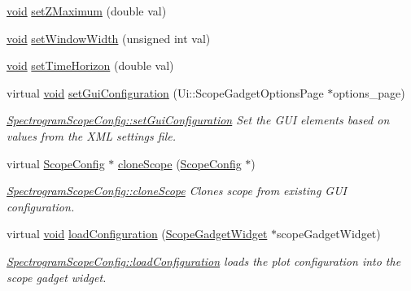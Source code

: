 \begin{DoxyCompactItemize}
\item 
\hyperlink{group___u_a_v_objects_plugin_ga444cf2ff3f0ecbe028adce838d373f5c}{void} \hyperlink{group___scope_plugin_ga4f71e9c45cd8cbebb11505f9f6d18a42}{set\-Z\-Maximum} (double val)
\item 
\hyperlink{group___u_a_v_objects_plugin_ga444cf2ff3f0ecbe028adce838d373f5c}{void} \hyperlink{group___scope_plugin_gaf3bc69a747cec5908674e2df1118cd82}{set\-Window\-Width} (unsigned int val)
\item 
\hyperlink{group___u_a_v_objects_plugin_ga444cf2ff3f0ecbe028adce838d373f5c}{void} \hyperlink{group___scope_plugin_ga511f9914f1f524bd49a6edfa18760501}{set\-Time\-Horizon} (double val)
\item 
virtual \hyperlink{group___u_a_v_objects_plugin_ga444cf2ff3f0ecbe028adce838d373f5c}{void} \hyperlink{group___scope_plugin_gaf4d1958704699a8b7bb596fef64c6bd5}{set\-Gui\-Configuration} (\-Ui\-::\-Scope\-Gadget\-Options\-Page $\ast$options\-\_\-page)
\begin{DoxyCompactList}\small\item\em \hyperlink{group___scope_plugin_gaf4d1958704699a8b7bb596fef64c6bd5}{\-Spectrogram\-Scope\-Config\-::set\-Gui\-Configuration} \-Set the \-G\-U\-I elements based on values from the \-X\-M\-L settings file. \end{DoxyCompactList}\item 
virtual \hyperlink{class_scope_config}{\-Scope\-Config} $\ast$ \hyperlink{group___scope_plugin_ga7d2fafe0c5f703d03825ad42689a9d73}{clone\-Scope} (\hyperlink{class_scope_config}{\-Scope\-Config} $\ast$)
\begin{DoxyCompactList}\small\item\em \hyperlink{group___scope_plugin_ga7d2fafe0c5f703d03825ad42689a9d73}{\-Spectrogram\-Scope\-Config\-::clone\-Scope} \-Clones scope from existing \-G\-U\-I configuration. \end{DoxyCompactList}\item 
virtual \hyperlink{group___u_a_v_objects_plugin_ga444cf2ff3f0ecbe028adce838d373f5c}{void} \hyperlink{group___scope_plugin_gaa4de5cf86195631ccdce65d67b22f31a}{load\-Configuration} (\hyperlink{class_scope_gadget_widget}{\-Scope\-Gadget\-Widget} $\ast$scope\-Gadget\-Widget)
\begin{DoxyCompactList}\small\item\em \hyperlink{group___scope_plugin_gaa4de5cf86195631ccdce65d67b22f31a}{\-Spectrogram\-Scope\-Config\-::load\-Configuration} loads the plot configuration into the scope gadget widget. \end{DoxyCompactList}\item 

\end{DoxyCompactItemize}
